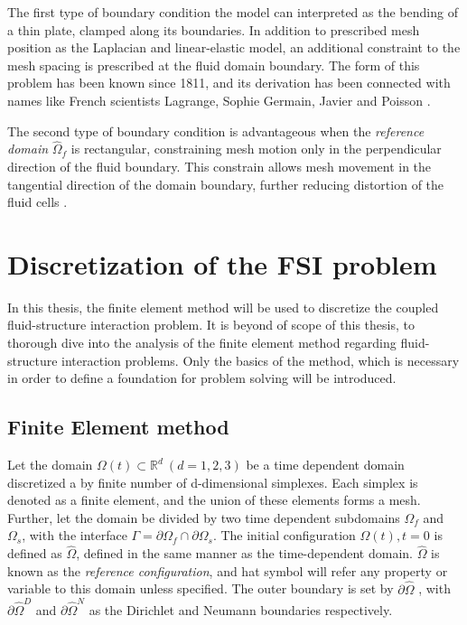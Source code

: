 The first type of boundary condition the model can interpreted as the bending of a thin plate, clamped along its boundaries. In addition to prescribed mesh position as the  Laplacian and linear-elastic model, an additional constraint to the mesh spacing is prescribed at the fluid domain boundary. The form of this problem has been known since 1811, and its derivation has been connected with names like  French scientists Lagrange, Sophie Germain, Javier and Poisson \cite{Meleshko1997}.  

The second type of boundary condition is advantageous when the \textit{reference domain} $\hat{\Omega}_f$ is rectangular, constraining mesh motion only in the perpendicular direction of the fluid boundary. This constrain allows  mesh movement in the tangential direction of the domain boundary, further reducing distortion of the fluid cells  \cite{Wicka}.  

\newpage

\newpage
\section{Discretization of the FSI problem}
In this thesis, the finite element method will be used to discretize the coupled fluid-structure interaction problem. It is beyond of scope  of this thesis, to thorough dive into the analysis of the finite element method regarding fluid-structure interaction problems. Only the basics of the method, which is necessary in order to define a foundation for problem solving will be introduced. 

\subsection{Finite Element method}
Let the domain $\Omega(t) \subset \mathbb{R}^d \ (d = 1, 2, 3) $  be a time dependent domain discretized a by finite number of d-dimensional simplexes.  Each simplex is denoted as a finite element, and the union of these elements forms a mesh. Further, let the domain be divided by two time dependent subdomains $\Omega_f$ and $\Omega_s$, with the interface $\Gamma = \partial \Omega_f \cap \partial \Omega_s$. The initial configuration $\Omega(t), t = 0 $ is defined as $\hat{\Omega}$, defined in the same manner as the time-dependent domain. $\hat{\Omega}$ is  known as the \textit{reference configuration}, and hat symbol will refer any property or variable to this domain unless specified. The outer boundary is set by $\partial \hat{\Omega}$ , with $\partial \hat{\Omega}^D$ and $\partial \hat{\Omega}^N$ as the Dirichlet and Neumann boundaries respectively. \\ \\

